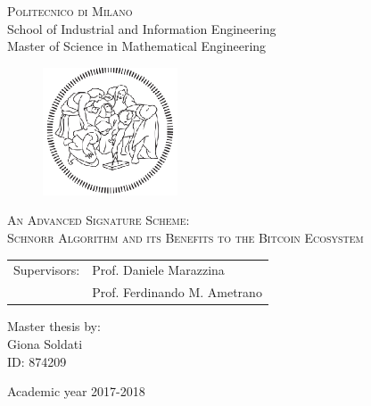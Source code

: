 \begin{titlepage}

	\begin{center}
		\normalsize 
			\textsc{Politecnico di Milano}\\
			School of Industrial and Information Engineering\\
			Master of Science in Mathematical Engineering\\

	\end{center}
	\vspace{.6cm}
	
	\begin{figure}[htpb]
		\centering
		\includegraphics[width=4cm]{Cover/polimi}
	\end{figure}
	\vspace{.6cm}
	
	\begin{center}
		\LARGE
			\textsc{An Advanced Signature Scheme: \\ Schnorr Algorithm and its Benefits to the Bitcoin Ecosystem}
	\end{center}
	\vspace{1.6cm}

	\begin{flushleft}
		\large
		\begin{tabular}{ll}
		Supervisors:    & Prof. Daniele Marazzina      \\
		             		   & Prof. Ferdinando M. Ametrano
		\end{tabular}
		\vspace{1cm}
	\end{flushleft}
	
	\begin{flushright}
		\large
		Master thesis by:\\
		Giona Soldati\\
		ID: 874209\\		
	\end{flushright}
	
	\vspace*{\fill}
	\begin{center}
		Academic year 2017-2018
	\end{center}
	
\end{titlepage}

